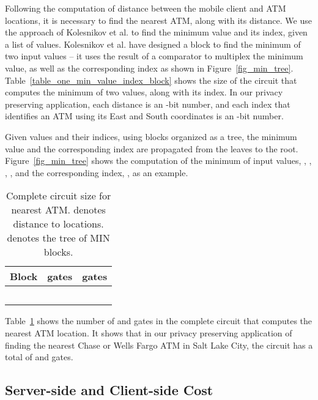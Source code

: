 \documentclass[10pt,journal,cspaper,compsoc]{IEEEtran}
\begin{document}
Following the computation of distance between the mobile client and  ATM locations, it is necessary to find the nearest ATM, along with its distance. We use the approach of Kolesnikov et al. \cite{kolesnikov09} to find the minimum value and its index, given a list of values. Kolesnikov et al. have designed a  block to find the minimum of two input values -- it uses the result of a comparator to multiplex the minimum value, as well as the corresponding index as shown in Figure~\ref{fig_min_tree}. Table~\ref{table_one_min_value_index_block} shows the size of the circuit that computes the minimum of two values, along with its index. In our privacy preserving application, each distance is an -bit number, and each index that identifies an ATM using its East and South coordinates is an -bit number.


Given  values and their indices, using   blocks organized as a tree, the minimum value and the corresponding index are propagated from the leaves to the root. Figure~\ref{fig_min_tree} shows the computation of the minimum of  input values, , , , , and the corresponding index, , as an example.


\begin{table}[!t]
\renewcommand{\arraystretch}{1.3}
\caption{Complete circuit size for nearest ATM.  denotes distance to  locations.  denotes the tree of MIN blocks.}
\label{table_complete_circuit_closest_ATM}
\centering
\begin{tabular}{||c||c||c||}
\hline
\bfseries Block & \bfseries  gates & \bfseries  gates\\
\hline
 &  & \\
\hline
 &  & \\
 &  & \\
\hline
 &  &\\
\hline
\hline
 &  & \\
\hline
\end{tabular}
\end{table}

Table~\ref{table_complete_circuit_closest_ATM} shows the number of  and  gates in the complete circuit that computes the nearest ATM location. It shows that in our privacy preserving application of finding the nearest Chase or Wells Fargo ATM in Salt Lake City, the circuit has a total of   and   gates.


\subsection{Server-side and Client-side Cost}
\end{document}
